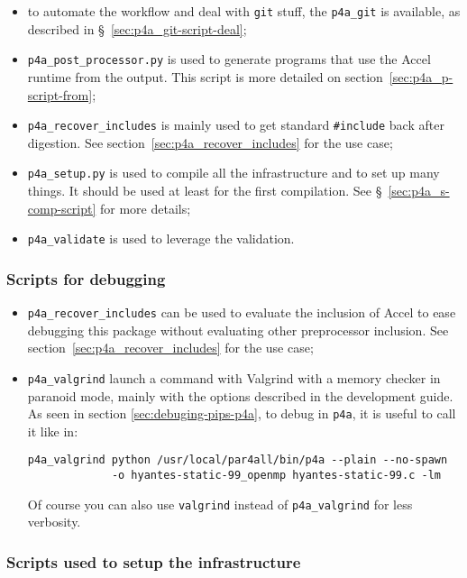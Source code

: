 \documentclass[a4paper]{article}
\begin{document}
\begin{itemize}
\item to automate the \Apfa workflow and deal with \texttt{git} stuff, the
  \verb|p4a_git| is available, as described in
  \S~\ref{sec:p4a_git-script-deal};
\item \verb|p4a_post_processor.py| is used to generate programs that use
  the \Apfa Accel runtime from the \Apips output. This script is more
  detailed on section~\ref{sec:p4a_p-script-from};
\item \verb|p4a_recover_includes| is mainly used to get standard
  \verb|#include| back after \Apips digestion. See
  section~\ref{sec:p4a_recover_includes} for the use case;
\item \verb|p4a_setup.py| is used to compile all the \Apfa infrastructure and
  to set up many things. It should be used at least for the first
  compilation. See \S~\ref{sec:p4a_s-comp-script} for more details;
\item \verb|p4a_validate| is used to leverage the \Apips validation.
\end{itemize}


\subsubsection{Scripts for debugging}
\label{sec:scripts-debugging}

\begin{itemize}
\item \verb|p4a_recover_includes| can be used to evaluate the inclusion of
  \Apfa Accel to ease debugging this package without evaluating other
  preprocessor inclusion. See section~\ref{sec:p4a_recover_includes} for
  the use case;
\item \verb|p4a_valgrind| launch a command with Valgrind with a memory
  checker in paranoid mode, mainly with the options described in the
  \Apips development guide. As seen in section
  \ref{sec:debuging-pips-p4a}, to debug \Apips in \texttt{p4a}, it is
  useful to call it like in:
\begin{verbatim}
p4a_valgrind python /usr/local/par4all/bin/p4a --plain --no-spawn
             -o hyantes-static-99_openmp hyantes-static-99.c -lm
\end{verbatim}
  Of course you can also use \texttt{valgrind} instead of
  \verb/p4a_valgrind/ for less verbosity.
\end{itemize}


\subsubsection{Scripts used to setup the infrastructure}
\label{sec:scripts-used-setup}
\end{document}
